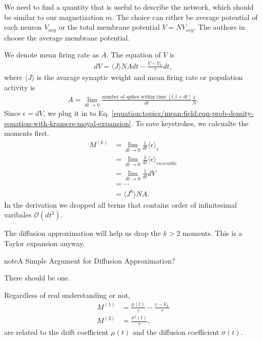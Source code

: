 \documentclass[letterpaper,10pt,english]{sphinxmanual}
\begin{document}
We need to find a quantity that is useful to describe the network, which should be similar to our magnetization \(m\). The choice can either be average potential of each neuron \(V_{avg}\) or the total membrane potential \(V=NV_{avg}\). The authors in \label{\detokenize{topics/mean-field:id5}}{\hyperref[\detokenize{topics/mean-field:deco2008}]{\sphinxcrossref{{[}Deco2008{]}}}} choose the average membrane potential.

We denote mean firing rate as \(A\). The equation of \(V\) is
\begin{equation*}
\begin{split}dV = \langle J\rangle N A dt - \frac{V-V_L}{\tau} dt,\end{split}
\end{equation*}
where \(\langle J\rangle\) is the avarage synaptic weight and mean firing rate or population activity is
\begin{equation*}
\begin{split}A = \lim_{dt\to 0} \frac{ \text{number of spikes within time } [t,t+dt] }{dt} \frac{1}{N}.\end{split}
\end{equation*}
Since \(\epsilon=dV\), we plug it in to Eq. \eqref{equation:topics/mean-field:eqn-prob-density-equation-with-kramers-moyal-expansion}. To save keystrokes, we calcualte the moments first.
\begin{equation*}
\begin{split}M^{(k)} &= \lim_{dt\to 0} \frac{1}{dt}\langle \epsilon\rangle_v \\
& = \lim_{dt\to 0} \frac{1}{dt}\langle \epsilon\rangle_{ensemble} \\
& = \lim_{dt\to 0} \frac{1}{dt} dV \\
& = \cdots \\
& = \langle J^k \rangle N A.\end{split}
\end{equation*}
In the derivation we dropped all terms that contains order of infinitesimal varibales \(\mathcal O (dt^2)\).

The diffusion approximation will help us drop the \(k>2\) moments. This is a Taylor expansion anyway.

\begin{sphinxadmonition}{note}{A Simple Argument for Diffusion Approximation?}

There should be one.

Regardless of real understanding or not,
\begin{equation*}
\begin{split}M^{(1)} &= \frac{\mu(t)}{\tau} - \frac{ v-V_L }{\tau} \\
M^{(2)} &= \frac{\sigma^2(t)}{\tau},\end{split}
\end{equation*}
are related to the drift coefficient \(\mu(t)\) and the diffusion coefficient \(\sigma(t)\).
\end{sphinxadmonition}
\end{document}
